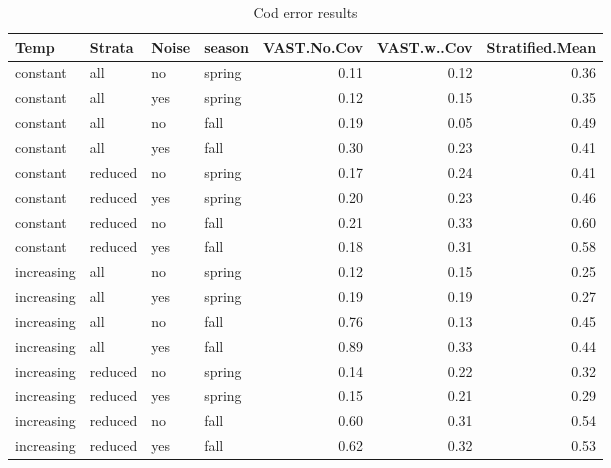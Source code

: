 \documentclass[
  12pt,
]{article}
\begin{document}
\begin{table}

\caption{\label{tab:unnamed-chunk-1}Cod error results}
\centering
\begin{tabular}[t]{l|l|l|l|r|r|r}
\hline
Temp & Strata & Noise & season & VAST.No.Cov & VAST.w..Cov & Stratified.Mean\\
\hline
constant & all & no & spring & 0.11 & 0.12 & 0.36\\
\hline
constant & all & yes & spring & 0.12 & 0.15 & 0.35\\
\hline
constant & all & no & fall & 0.19 & 0.05 & 0.49\\
\hline
constant & all & yes & fall & 0.30 & 0.23 & 0.41\\
\hline
constant & reduced & no & spring & 0.17 & 0.24 & 0.41\\
\hline
constant & reduced & yes & spring & 0.20 & 0.23 & 0.46\\
\hline
constant & reduced & no & fall & 0.21 & 0.33 & 0.60\\
\hline
constant & reduced & yes & fall & 0.18 & 0.31 & 0.58\\
\hline
increasing & all & no & spring & 0.12 & 0.15 & 0.25\\
\hline
increasing & all & yes & spring & 0.19 & 0.19 & 0.27\\
\hline
increasing & all & no & fall & 0.76 & 0.13 & 0.45\\
\hline
increasing & all & yes & fall & 0.89 & 0.33 & 0.44\\
\hline
increasing & reduced & no & spring & 0.14 & 0.22 & 0.32\\
\hline
increasing & reduced & yes & spring & 0.15 & 0.21 & 0.29\\
\hline
increasing & reduced & no & fall & 0.60 & 0.31 & 0.54\\
\hline
increasing & reduced & yes & fall & 0.62 & 0.32 & 0.53\\
\hline
\end{tabular}
\end{table}
\end{document}
